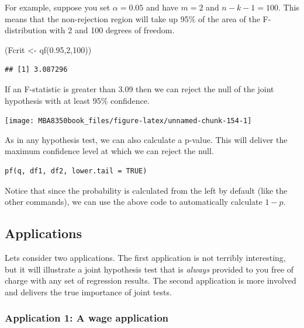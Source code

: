 \documentclass[
]{book}
\newenvironment{Shaded}{\begin{snugshade}}{\end{snugshade}}
\newcommand{\DecValTok}[1]{\textcolor[rgb]{0.00,0.00,0.81}{#1}}
\newcommand{\FloatTok}[1]{\textcolor[rgb]{0.00,0.00,0.81}{#1}}
\newcommand{\FunctionTok}[1]{\textcolor[rgb]{0.00,0.00,0.00}{#1}}
\newcommand{\NormalTok}[1]{#1}
\newcommand{\OtherTok}[1]{\textcolor[rgb]{0.56,0.35,0.01}{#1}}
\begin{document}
For example, suppose you set \(\alpha = 0.05\) and have \(m=2\) and \(n-k-1 = 100\). This means that the non-rejection region will take up 95\% of the area of the F-distribution with 2 and 100 degrees of freedom.

\begin{Shaded}
\begin{Highlighting}[]
\NormalTok{(Fcrit }\OtherTok{\textless{}{-}} \FunctionTok{qf}\NormalTok{(}\FloatTok{0.95}\NormalTok{,}\DecValTok{2}\NormalTok{,}\DecValTok{100}\NormalTok{))}
\end{Highlighting}
\end{Shaded}

\begin{verbatim}
## [1] 3.087296
\end{verbatim}

If an F-statistic is greater than 3.09 then we can reject the null of the joint hypothesis with at least 95\% confidence.

\begin{center}\texttt{[image: MBA8350book\_files/figure-latex/unnamed-chunk-154-1]} \end{center}

As in any hypothesis test, we can also calculate a p-value. This will deliver the maximum confidence level at which we can reject the null.

\begin{verbatim}
pf(q, df1, df2, lower.tail = TRUE)
\end{verbatim}

Notice that since the probability is calculated from the left by default (like the other commands), we can use the above code to automatically calculate \(1-p\).

\hypertarget{applications}{%
\subsection{Applications}\label{applications}}

Lets consider two applications. The first application is not terribly interesting, but it will illustrate a joint hypothesis test that is \emph{always} provided to you free of charge with any set of regression results. The second application is more involved and delivers the true importance of joint tests.

\hypertarget{application-1-a-wage-application}{%
\subsubsection*{Application 1: A wage application}\label{application-1-a-wage-application}}
\end{document}
